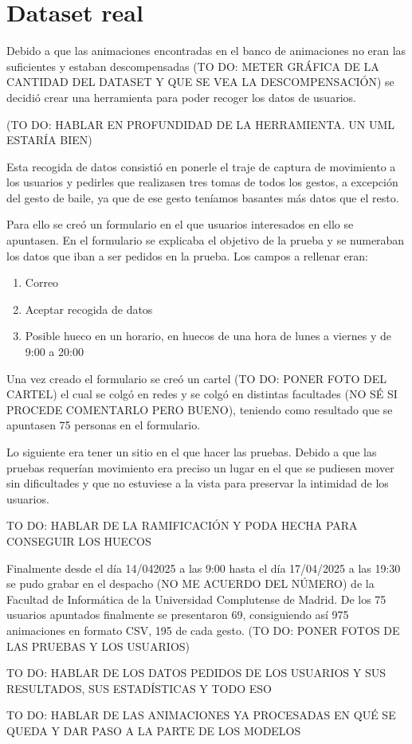 \section{Dataset real}
\label{sec:datasetReal}
Debido a que las animaciones encontradas en el banco de animaciones no eran las suficientes y estaban descompensadas (TO DO: METER GRÁFICA DE LA CANTIDAD DEL DATASET Y QUE SE VEA LA DESCOMPENSACIÓN) se decidió crear una herramienta para poder recoger los datos de usuarios.

(TO DO: HABLAR EN PROFUNDIDAD DE LA HERRAMIENTA. UN UML ESTARÍA BIEN)

Esta recogida de datos consistió en ponerle el traje de captura de movimiento a los usuarios y pedirles que realizasen tres tomas de todos los gestos, a excepción del gesto de baile, ya que de ese gesto teníamos basantes más datos que el resto.

Para ello se creó un formulario en el que usuarios interesados en ello se apuntasen. En el formulario se explicaba el objetivo de la prueba y se numeraban los datos que iban a ser pedidos en la prueba. Los campos a rellenar eran: 

\begin{enumerate}
	\item Correo
	\item Aceptar recogida de datos
	\item Posible hueco en un horario, en huecos de una hora de lunes a viernes y de 9:00 a 20:00
\end{enumerate}

Una vez creado el formulario se creó un cartel (TO DO: PONER FOTO DEL CARTEL) el cual se colgó en redes y se colgó en distintas facultades (NO SÉ SI PROCEDE COMENTARLO PERO BUENO), teniendo como resultado que se apuntasen 75 personas en el formulario.

Lo siguiente era tener un sitio en el que hacer las pruebas. Debido a que las pruebas requerían movimiento era preciso un lugar en el que se pudiesen mover sin dificultades y que no estuviese a la vista para preservar la intimidad de los usuarios.

TO DO: HABLAR DE LA RAMIFICACIÓN Y PODA HECHA PARA CONSEGUIR LOS HUECOS

Finalmente desde el día 14/042025 a las 9:00 hasta el día 17/04/2025 a las 19:30 se pudo grabar en el despacho (NO ME ACUERDO DEL NÚMERO) de la Facultad de Informática de la Universidad Complutense de Madrid.
De los 75 usuarios apuntados finalmente se presentaron 69, consiguiendo así 975 animaciones en formato CSV, 195 de cada gesto. (TO DO: PONER FOTOS DE LAS PRUEBAS Y LOS USUARIOS)

TO DO: HABLAR DE LOS DATOS PEDIDOS DE LOS USUARIOS Y SUS RESULTADOS, SUS ESTADÍSTICAS Y TODO ESO

TO DO: HABLAR DE LAS ANIMACIONES YA PROCESADAS EN QUÉ SE QUEDA Y DAR PASO A LA PARTE DE LOS MODELOS